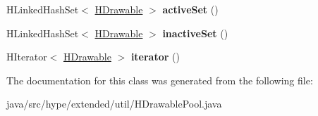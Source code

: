 \begin{DoxyCompactItemize}
\item 
\hypertarget{classhype_1_1extended_1_1util_1_1_h_drawable_pool_aa3c264209b219846faeb719a3b4b86d5}{H\-Linked\-Hash\-Set$<$ \hyperlink{classhype_1_1core_1_1drawable_1_1_h_drawable}{H\-Drawable} $>$ {\bfseries active\-Set} ()}\label{classhype_1_1extended_1_1util_1_1_h_drawable_pool_aa3c264209b219846faeb719a3b4b86d5}

\item 
\hypertarget{classhype_1_1extended_1_1util_1_1_h_drawable_pool_afff8c3e12cb443a06d16c3bd7138f2f9}{H\-Linked\-Hash\-Set$<$ \hyperlink{classhype_1_1core_1_1drawable_1_1_h_drawable}{H\-Drawable} $>$ {\bfseries inactive\-Set} ()}\label{classhype_1_1extended_1_1util_1_1_h_drawable_pool_afff8c3e12cb443a06d16c3bd7138f2f9}

\item 
\hypertarget{classhype_1_1extended_1_1util_1_1_h_drawable_pool_a723e2671867092dd79f7e1d88d9b190f}{H\-Iterator$<$ \hyperlink{classhype_1_1core_1_1drawable_1_1_h_drawable}{H\-Drawable} $>$ {\bfseries iterator} ()}\label{classhype_1_1extended_1_1util_1_1_h_drawable_pool_a723e2671867092dd79f7e1d88d9b190f}

\end{DoxyCompactItemize}


The documentation for this class was generated from the following file\-:\begin{DoxyCompactItemize}
\item 
java/src/hype/extended/util/H\-Drawable\-Pool.\-java\end{DoxyCompactItemize}
